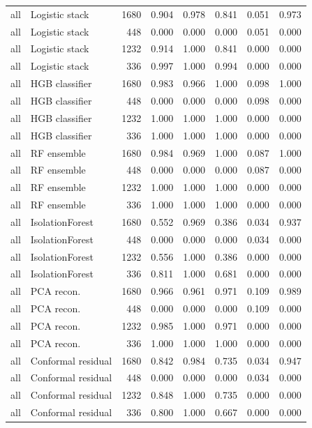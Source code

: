 {\begin{longtable}{llrrrrrr}
all & Logistic stack & 1680 & 0.904 & 0.978 & 0.841 & 0.051 & 0.973 \\
all & Logistic stack & 448 & 0.000 & 0.000 & 0.000 & 0.051 & 0.000 \\
all & Logistic stack & 1232 & 0.914 & 1.000 & 0.841 & 0.000 & 0.000 \\
all & Logistic stack & 336 & 0.997 & 1.000 & 0.994 & 0.000 & 0.000 \\
all & HGB classifier & 1680 & 0.983 & 0.966 & 1.000 & 0.098 & 1.000 \\
all & HGB classifier & 448 & 0.000 & 0.000 & 0.000 & 0.098 & 0.000 \\
all & HGB classifier & 1232 & 1.000 & 1.000 & 1.000 & 0.000 & 0.000 \\
all & HGB classifier & 336 & 1.000 & 1.000 & 1.000 & 0.000 & 0.000 \\
all & RF ensemble & 1680 & 0.984 & 0.969 & 1.000 & 0.087 & 1.000 \\
all & RF ensemble & 448 & 0.000 & 0.000 & 0.000 & 0.087 & 0.000 \\
all & RF ensemble & 1232 & 1.000 & 1.000 & 1.000 & 0.000 & 0.000 \\
all & RF ensemble & 336 & 1.000 & 1.000 & 1.000 & 0.000 & 0.000 \\
all & IsolationForest & 1680 & 0.552 & 0.969 & 0.386 & 0.034 & 0.937 \\
all & IsolationForest & 448 & 0.000 & 0.000 & 0.000 & 0.034 & 0.000 \\
all & IsolationForest & 1232 & 0.556 & 1.000 & 0.386 & 0.000 & 0.000 \\
all & IsolationForest & 336 & 0.811 & 1.000 & 0.681 & 0.000 & 0.000 \\
all & PCA recon. & 1680 & 0.966 & 0.961 & 0.971 & 0.109 & 0.989 \\
all & PCA recon. & 448 & 0.000 & 0.000 & 0.000 & 0.109 & 0.000 \\
all & PCA recon. & 1232 & 0.985 & 1.000 & 0.971 & 0.000 & 0.000 \\
all & PCA recon. & 336 & 1.000 & 1.000 & 1.000 & 0.000 & 0.000 \\
all & Conformal residual & 1680 & 0.842 & 0.984 & 0.735 & 0.034 & 0.947 \\
all & Conformal residual & 448 & 0.000 & 0.000 & 0.000 & 0.034 & 0.000 \\
all & Conformal residual & 1232 & 0.848 & 1.000 & 0.735 & 0.000 & 0.000 \\
all & Conformal residual & 336 & 0.800 & 1.000 & 0.667 & 0.000 & 0.000 \\

\end{longtable}}
